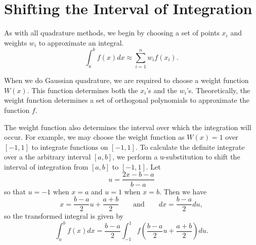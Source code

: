 \label{Lab:GaussQuad}



\section*{Shifting the Interval of Integration} %

As with all quadrature methods, we begin by choosing a set of points $x_i$ and weights $w_i$ to approximate an integral.
\[
\int_{a}^b f(x) dx \approx \sum_{i=1}^n w_if(x_i).
\]

When we do Gaussian quadrature, we are required to choose a weight function $W(x)$.
This function determines both the $x_i$'s and the $w_i$'s. %
Theoretically, the weight function determines a set of orthogonal polynomials to approximate the function $f$.

The weight function also determines the interval over which the integration will occur.
For example, we may choose the weight function as $W(x) = 1$ over $[-1,1]$ to integrate functions on $[-1,1]$.
To calculate the definite integrate over a the arbitrary interval $[a,b]$, we perform a u-substitution to shift the interval of integration from $[a,b]$ to $[-1,1]$.
Let \[u = \frac{2x - b - a}{b - a}\] so that $u = -1$ when $x = a$ and $u = 1$ when $x=b$.
Then we have \[x = \frac{b - a}{2}u + \frac{a + b}{2}\qquad \text{and}\qquad dx = \frac{b - a}{2}du,\] so the transformed integral is given by
\begin{equation}
\int_a^b f(x) dx = \frac{b-a}{2}\int_{-1}^1 f\left(\frac{b-a}{2}u + \frac{a+b}{2}\right)du.
\label{eq:quadrature-usub}
\end{equation}

